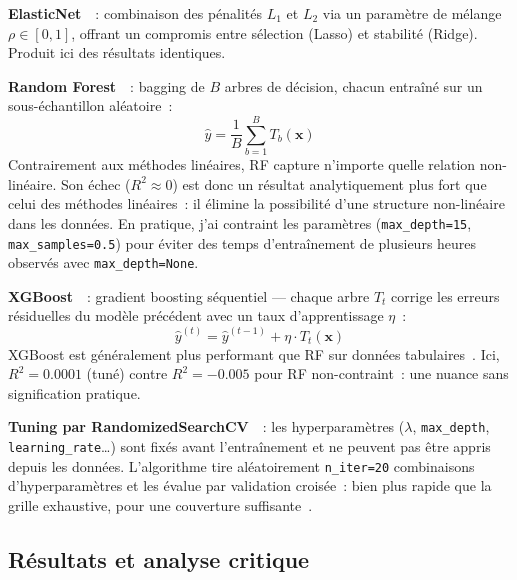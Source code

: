 \textbf{ElasticNet}~\cite{hastie2009}~: combinaison des pénalités $L_1$ et $L_2$ via un paramètre de mélange $\rho \in [0,1]$, offrant un compromis entre sélection (Lasso) et stabilité (Ridge). Produit ici des résultats identiques.

\textbf{Random Forest}~\cite{breiman2001}~: bagging de $B$ arbres de décision, chacun entraîné sur un sous-échantillon aléatoire~:
\begin{equation}
\hat{y} = \frac{1}{B}\sum_{b=1}^{B} T_b(\mathbf{x})
\end{equation}
Contrairement aux méthodes linéaires, RF capture n'importe quelle relation non-linéaire. Son échec ($R^2 \approx 0$) est donc un résultat analytiquement plus fort que celui des méthodes linéaires~: il élimine la possibilité d'une structure non-linéaire dans les données. En pratique, j'ai contraint les paramètres (\texttt{max\_depth=15}, \texttt{max\_samples=0.5}) pour éviter des temps d'entraînement de plusieurs heures observés avec \texttt{max\_depth=None}.

\textbf{XGBoost}~\cite{chen2016}~: gradient boosting séquentiel --- chaque arbre $T_t$ corrige les erreurs résiduelles du modèle précédent avec un taux d'apprentissage $\eta$~:
\begin{equation}
\hat{y}^{(t)} = \hat{y}^{(t-1)} + \eta \cdot T_t(\mathbf{x})
\end{equation}
XGBoost est généralement plus performant que RF sur données tabulaires~\cite{grinsztajn2022}. Ici, $R^2 = 0.0001$ (tuné) contre $R^2 = -0.005$ pour RF non-contraint~: une nuance sans signification pratique.

\begin{sloppypar}
\textbf{Tuning par RandomizedSearchCV}~\cite{bergstra2012}~: les hyperparamètres ($\lambda$, \texttt{max\_depth}, \texttt{learning\_rate}\ldots) sont fixés avant l'entraînement et ne peuvent pas être appris depuis les données. L'algorithme tire aléatoirement \texttt{n\_iter=20} combinaisons d'hyperparamètres et les évalue par validation croisée~: bien plus rapide que la grille exhaustive, pour une couverture suffisante~\cite{bergstra2012}.
\end{sloppypar}

\subsection{Résultats et analyse critique}

